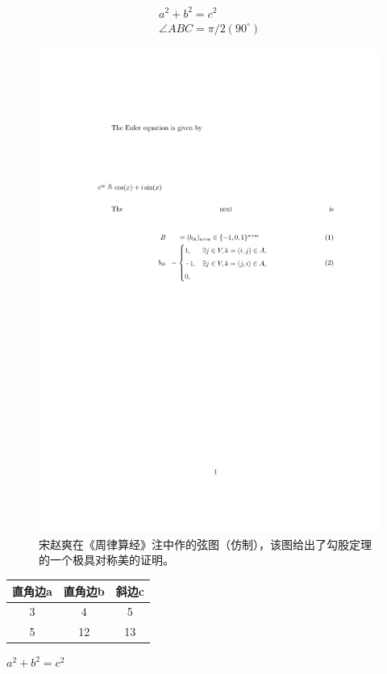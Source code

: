 \documentclass[12pt]{ctexart}
\begin{document}
	\begin{eqnarray}\label{eq:gougu}
		a^2+b^2=c^2\\
		\angle ABC = \pi/2(90^{\circ})
	\end{eqnarray}
	\begin{figure}[ht]
		\centering 
		\includegraphics[width=12cm]{aaa.pdf}
		\caption{宋赵爽在《周律算经》注中作的弦图（仿制），该图给出了勾股定理的一个极具对称美的证明。}
		\label{fig:xiantu}
	\end{figure}

	\begin{table}[h]
		\centering
	\begin{tabular}{|c|c|c|}
		\hline
		直角边a&直角边b&斜边c\\
		\hline
		3&4&5\\
		5&12&13\\
		\hline
	\end{tabular}
	\end{table}

	\qquad $a^2+b^2=c^2$
	\newpage
	\nocite{shiye}
	
\end{document}
